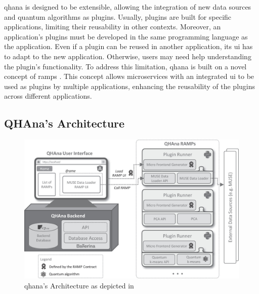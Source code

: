 \documentclass[
  a4paper,  %
  twoside,  %
  bibliography=totoc,
  headsepline,
  cleardoublepage=empty,
  parskip=half,
  draft=false
]{scrbook}
\begin{document}
\gls{qhana} is designed to be extensible, allowing the integration of new data sources and quantum algorithms as plugins.
Usually, plugins are built for specific applications, limiting their reusability in other contexts.
Moreover, an application's plugins must be developed in the same programming language as the application.
Even if a plugin can be reused in another application, its \gls{ui} has to adapt to the new application.
Otherwise, users may need help understanding the plugin's functionality.
To address this limitation, \gls{qhana} is built on a novel concept of \glspl{ramp} \cite{Buehler2022}.
This concept allows microservices with an integrated \gls{ui} to be used as plugins by multiple applications, enhancing the reusability of the plugins across different applications.

\subsection{QHAna's Architecture}
\label{subsec:qhanaArchitecture}

\begin{figure}
  \centering
  \includegraphics[width=\textwidth]{graphics/qhanaarch.png}
  \caption{\gls{qhana}'s Architecture as depicted in \cite{Buehler2022}}
  \label{fig:qhanaarch}
\end{figure}
\end{document}
